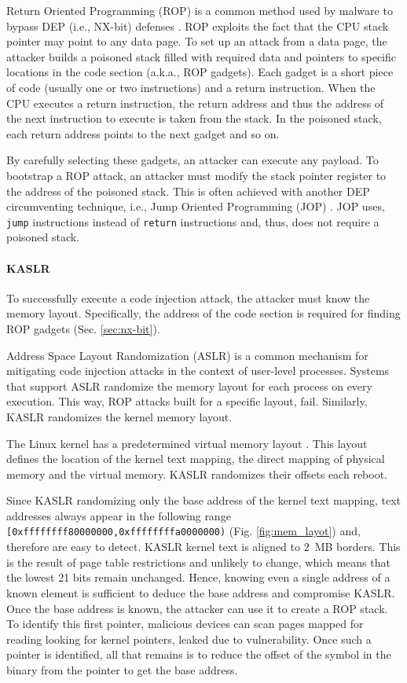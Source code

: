 Return Oriented Programming (ROP) is a common method used by malware to bypass DEP (i.e., NX-bit) defenses \cite{RBSS12}. ROP exploits the fact that the CPU stack pointer may point to any data page. To set up an attack from a data page, the attacker builds a poisoned stack filled with required data and pointers to specific locations in the code section (a.k.a., ROP gadgets). Each gadget is a short piece of code (usually one or two instructions) and a return instruction. When the CPU executes a return instruction, the return address and thus the address of the next instruction to execute is taken from the stack. In the poisoned stack, each return address points to the next gadget and so on. 
 
By carefully selecting these gadgets, an attacker can execute any payload. To bootstrap a ROP attack, an attacker must modify the stack pointer register to the address of the poisoned stack. This is often achieved with another DEP circumventing technique, i.e., Jump Oriented Programming (JOP) \cite{BJFL11}. JOP uses, \texttt{jump} instructions instead of \texttt{return} instructions and, thus, does not require a poisoned stack.

\paragraph{KASLR}\label{sec:kaslr}

To successfully execute a code injection attack, the attacker must know the memory layout. Specifically, the address of the code section is required for finding ROP gadgets (Sec. \ref{sec:nx-bit}). 

Address Space Layout Randomization (ASLR) is a common mechanism for mitigating code injection attacks in the context of user-level processes. Systems that support ASLR randomize the memory layout for each process on every execution. This way, ROP attacks built for a specific layout, fail. Similarly, KASLR \cite{kalsr} randomizes the kernel memory layout.

The Linux kernel has a predetermined virtual memory layout \cite{mem_layout}. This layout defines the location of the kernel text mapping, the direct mapping of physical memory and the virtual memory. KASLR randomizes their offsets each reboot.

Since KASLR randomizing only the base address of the kernel text mapping, text addresses always appear in the following range \texttt{[0xffffffff80000000,0xffffffffa0000000)} (Fig. \ref{fig:mem_layot}) and, therefore are easy to detect. KASLR kernel text is aligned to 2~MB borders. This is the result of page table restrictions and unlikely to change, which means that the lowest 21 bits remain unchanged. Hence, knowing even a single address of a known element is sufficient to deduce the base address and compromise KASLR. Once the base address is known, the attacker can use it to create a ROP stack.
To identify this first pointer, malicious devices can scan pages mapped for reading looking for kernel pointers, leaked due to \subpage{} vulnerability. Once such a pointer is identified, all that remains is to reduce the offset of the symbol in the binary from the pointer to get the base address.

